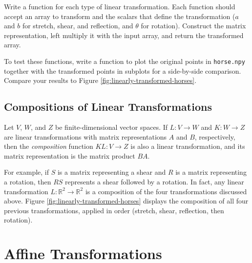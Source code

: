 \begin{problem} %
Write a function for each type of linear transformation.
Each function should accept an array to transform and the scalars that define the transformation ($a$ and $b$ for stretch, shear, and reflection, and $\theta$ for rotation).
Construct the matrix representation, left multiply it with the input array, and return the transformed array.

To test these functions, write a function to plot the original points in
\texttt{horse.npy} together with the transformed points in subplots for a side-by-side comparison.
Compare your results to Figure \ref{fig:linearly-transformed-horses}.
\label{prob:implement-linear-transformations}
\end{problem}

\begin{comment} %
\begin{info} %
Reflections and rotations are two ways to implement the QR decomposition, an important matrix factorization that will be studied in another lab.
\end{info}
\end{comment}

\subsection*{Compositions of Linear Transformations} %

Let $V$, $W$, and $Z$ be finite-dimensional vector spaces.
If $L:V\rightarrow W$ and $K:W\rightarrow Z$ are linear transformations with matrix representations $A$ and $B$, respectively, then the \emph{composition} function $KL:V\rightarrow Z$ is also a linear transformation, and its matrix representation is the matrix product $BA$.

For example, if $S$ is a matrix representing a shear and $R$ is a matrix representing a rotation, then $RS$ represents a shear followed by a rotation.
In fact, any linear transformation $L:\mathbb{R}^2 \rightarrow\mathbb{R}^2$ is a composition of the four transformations discussed above.
Figure \ref{fig:linearly-transformed-horses} displays the composition of all four previous transformations, applied in order (stretch, shear, reflection, then rotation).

\section*{Affine Transformations} %

